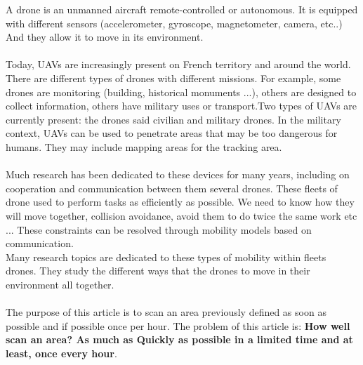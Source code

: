 A drone is an unmanned aircraft remote-controlled or autonomous. It is equipped with different sensors (accelerometer, gyroscope, magnetometer, camera, etc..) And they allow it to move in its environment.\\\\

Today, UAVs are increasingly present on French territory and around the world. There are different types of drones with different missions. For example, some drones are monitoring (building, historical monuments ...), others are designed to collect information, others have military uses or transport.Two types of UAVs are currently present: the drones said civilian and military drones. In the military context, UAVs can be used to penetrate areas that may be too dangerous for humans. They may include mapping areas for the tracking area.\\\\


Much research has been dedicated to these devices for many years, including on cooperation and communication between them several drones. These fleets of drone used to perform tasks as efficiently as possible. We need to know how they will move together, collision avoidance, avoid them to do twice the same work etc ... These constraints can be resolved through mobility models based on communication.\\
Many research topics are dedicated to these types of mobility within fleets drones. They study the different ways that the drones to move in their environment all together.\\\\

The purpose of this article is to scan an area previously defined as soon as possible and if possible once per hour. The problem of this article is:
\textbf{How well scan an area? As much as Quickly as possible in a limited time and at least, once every hour}.